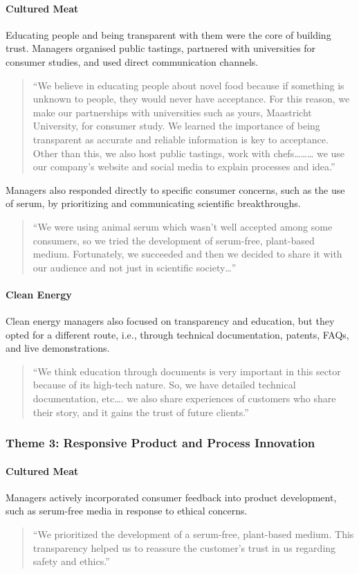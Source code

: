 \paragraph{Cultured Meat}
Educating people and being transparent with them were the core of building trust. Managers organised public tastings, partnered with universities for consumer studies, and used direct communication channels.
\begin{quote}
	“We believe in educating people about novel food because if something is unknown to people, they would never have acceptance. For this reason, we make our partnerships with universities such as yours, Maastricht University, for consumer study. We learned the importance of being transparent as accurate and reliable information is key to acceptance. Other than this, we also host public tastings, work with chefs……… we use our company’s website and social media to explain processes and idea.”
\end{quote}
Managers also responded directly to specific consumer concerns, such as the use of serum, by prioritizing and communicating scientific breakthroughs.
\begin{quote}
	“We were using animal serum which wasn’t well accepted among some consumers, so we tried the development of serum-free, plant-based medium. Fortunately, we succeeded and then we decided to share it with our audience and not just in scientific society…”
\end{quote}

\paragraph{Clean Energy}
Clean energy managers also focused on transparency and education, but they opted for a different route, i.e., through technical documentation, patents, FAQs, and live demonstrations.
\begin{quote}
	“We think education through documents is very important in this sector because of its high-tech nature. So, we have detailed technical documentation, etc…. we also share experiences of customers who share their story, and it gains the trust of future clients.”
\end{quote}

\subsubsection{Theme 3: Responsive Product and Process Innovation}
\paragraph{Cultured Meat}
Managers actively incorporated consumer feedback into product development, such as serum-free media in response to ethical concerns.
\begin{quote}
	“We prioritized the development of a serum-free, plant-based medium. This transparency helped us to reassure the customer’s trust in us regarding safety and ethics.”
\end{quote}

